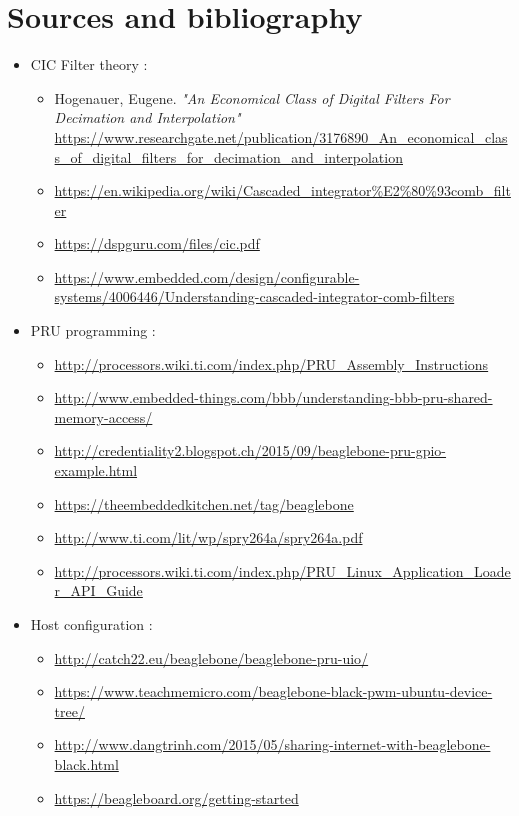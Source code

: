 \documentclass[]{report}
\providecommand{\tightlist}{%
	\setlength{\itemsep}{0pt}\setlength{\parskip}{0pt}}
\begin{document}
\hypertarget{sources-and-bibliography}{%
\chapter*{Sources and bibliography}\label{sources-and-bibliography}}

\begin{itemize}
\tightlist
\item
  CIC Filter theory :
  
  

  \begin{itemize}
  \tightlist
  \item
    Hogenauer, Eugene. \emph{"An Economical Class of Digital Filters
    For Decimation and Interpolation"} \url{https://www.researchgate.net/publication/3176890_An_economical_class_of_digital_filters_for_decimation_and_interpolation}
  \item
    \url{https://en.wikipedia.org/wiki/Cascaded_integrator%E2%80%93comb_filter}
  \item
    \url{https://dspguru.com/files/cic.pdf}
  \item
    \url{https://www.embedded.com/design/configurable-systems/4006446/Understanding-cascaded-integrator-comb-filters}
  \end{itemize}
\item
  PRU programming :

  \begin{itemize}
  \tightlist
  \item
    \url{http://processors.wiki.ti.com/index.php/PRU\_Assembly\_Instructions}
  \item
    \url{http://www.embedded-things.com/bbb/understanding-bbb-pru-shared-memory-access/}
  \item
    \url{http://credentiality2.blogspot.ch/2015/09/beaglebone-pru-gpio-example.html}
  \item
    \url{https://theembeddedkitchen.net/tag/beaglebone}
  \item
    \url{http://www.ti.com/lit/wp/spry264a/spry264a.pdf}
  \item
    \url{http://processors.wiki.ti.com/index.php/PRU\_Linux\_Application\_Loader\_API\_Guide}
  \end{itemize}
\item
  Host configuration :

  \begin{itemize}
  \tightlist
  \item
    \url{http://catch22.eu/beaglebone/beaglebone-pru-uio/}
  \item
    \url{https://www.teachmemicro.com/beaglebone-black-pwm-ubuntu-device-tree/}
  \item
    \url{http://www.dangtrinh.com/2015/05/sharing-internet-with-beaglebone-black.html}
  \item
    \url{https://beagleboard.org/getting-started}
  \end{itemize}
\end{itemize}
\end{document}
